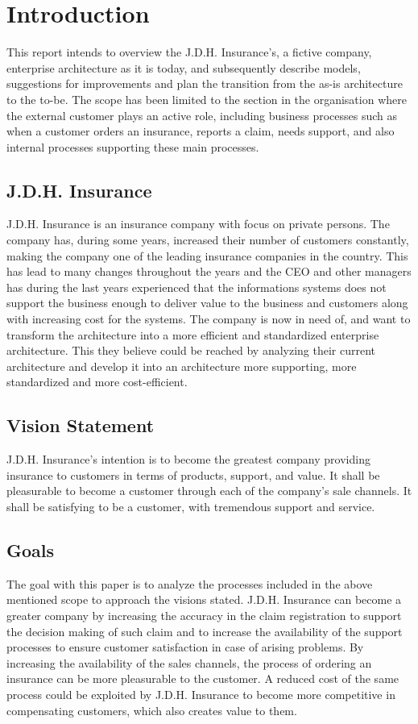 \section{Introduction}
\label{sec:introduction}
This report intends to overview the J.D.H. Insurance's, a fictive company, enterprise architecture as it is today, and subsequently describe models, suggestions for improvements and plan the transition from the as-is architecture to the to-be. The scope has been limited to the section in the organisation where the external customer plays an active role, including business processes such as when a customer orders an insurance, reports a claim, needs support, and also internal processes supporting these main processes.
\subsection{J.D.H. Insurance}
\label{sec:j_d_h_insurance}
J.D.H. Insurance is an insurance company with focus on private persons. The company has, during some years, increased their number of customers constantly, making the company one of the leading insurance companies in the country. This has lead to many changes throughout the years and the CEO and other managers has during the last years experienced that the informations systems does not support the business enough to deliver value to the business and customers along with increasing cost for the systems. The company is now in need of, and want to transform the architecture into a more efficient and standardized enterprise architecture. This they believe could be reached by analyzing their current architecture and develop it into an architecture more supporting, more standardized and more cost-efficient.
\subsection{Vision Statement}
\label{sec:vision_statement}
J.D.H. Insurance's intention is to become the greatest company providing insurance to customers in terms of products, support, and value. It shall be pleasurable to become a customer through each of the company's sale channels. It shall be satisfying to be a customer, with tremendous support and service.
\subsection{Goals}
\label{sec:goals}
The goal with this paper is to analyze the processes included in the above mentioned scope to approach the visions stated. J.D.H. Insurance can become a greater company by increasing the accuracy in the claim registration to support the decision making of such claim and to increase the availability of the support processes to ensure customer satisfaction in case of arising problems. By increasing the availability of the sales channels, the process of ordering an insurance can be more pleasurable to the customer. A reduced cost of the same process could be exploited by J.D.H. Insurance to become more competitive in compensating customers, which also creates value to them.
